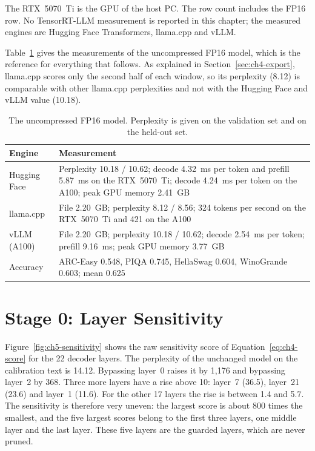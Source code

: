 The RTX~5070~Ti is the GPU of the host PC. The row count includes the FP16 row. No TensorRT-LLM measurement is reported in this chapter; the measured engines are Hugging Face Transformers, llama.cpp and vLLM.

Table~\ref{tab:ch5-fp16} gives the measurements of the uncompressed FP16 model, which is the reference for everything that follows. As explained in Section~\ref{sec:ch4-export}, llama.cpp scores only the second half of each window, so its perplexity (8.12) is comparable with other llama.cpp perplexities and not with the Hugging Face and vLLM value (10.18).

\begin{table}[htbp]
\centering
\small
\caption{The uncompressed FP16 model. Perplexity is given on the validation set and on the held-out set.}
\label{tab:ch5-fp16}
\renewcommand{\arraystretch}{1.2}
\begin{tabularx}{\textwidth}{lX}
\hline
\textbf{Engine} & \textbf{Measurement} \\
\hline
Hugging Face & Perplexity 10.18 / 10.62; decode 4.32~ms per token and prefill 5.87~ms on the RTX~5070~Ti; decode 4.24~ms per token on the A100; peak GPU memory 2.41~GB \\
llama.cpp & File 2.20~GB; perplexity 8.12 / 8.56; 324 tokens per second on the RTX~5070~Ti and 421 on the A100 \\
vLLM (A100) & File 2.20~GB; perplexity 10.18 / 10.62; decode 2.54~ms per token; prefill 9.16~ms; peak GPU memory 3.77~GB \\
Accuracy & ARC-Easy 0.548, PIQA 0.745, HellaSwag 0.604, WinoGrande 0.603; mean 0.625 \\
\hline
\end{tabularx}
\end{table}

\section{Stage 0: Layer Sensitivity}
\label{sec:ch5-stage0}

Figure~\ref{fig:ch5-sensitivity} shows the raw sensitivity score of Equation~\ref{eq:ch4-score} for the 22 decoder layers. The perplexity of the unchanged model on the calibration text is 14.12. Bypassing layer~0 raises it by 1{,}176 and bypassing layer~2 by 368. Three more layers have a rise above 10: layer~7 (36.5), layer~21 (23.6) and layer~1 (11.6). For the other 17 layers the rise is between 1.4 and 5.7. The sensitivity is therefore very uneven: the largest score is about 800 times the smallest, and the five largest scores belong to the first three layers, one middle layer and the last layer. These five layers are the guarded layers, which are never pruned.

